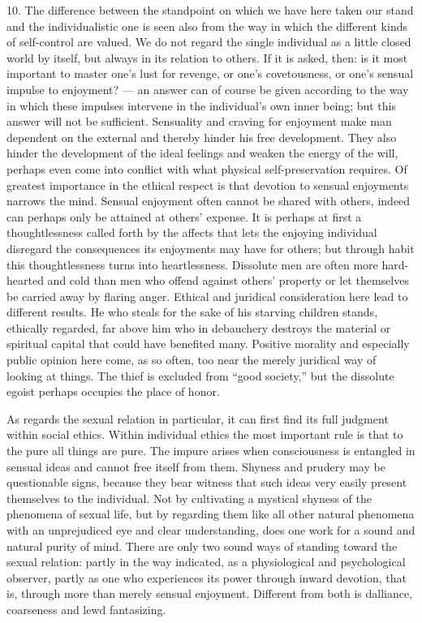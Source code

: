 \documentclass[12pt,a4paper,openany]{book}
\newcommand{\opage}[1]{\marginnote{\footnotesize\textit{[#1]}}}
\begin{document}
10. The difference between the standpoint on which we have here taken our stand and the individualistic one is seen
also from the way in which the different kinds of self-control are valued. We do not regard the single individual as
a little closed world by itself, but always in its relation to others. If it is asked, then: is it most important
to master one's lust for revenge, or one's covetousness, or one's sensual impulse to enjoyment? --- an answer can of
course be given according to the way in which these impulses intervene in the individual's own inner being; but this
answer will not be sufficient. Sensuality and craving for enjoyment make man dependent on the external and thereby
hinder his free development. They also hinder the development of the ideal feelings and weaken the energy of the
will, perhaps even come into conflict with what physical self-preservation requires. Of greatest importance in the
ethical respect is that devotion to sensual enjoyments narrows the mind. Sensual enjoyment often cannot be shared
with others, indeed can perhaps only be attained at others' expense. It is perhaps at first a thoughtlessness called
forth by the affects that lets the enjoying individual disregard the consequences its enjoyments may have for
others; but through habit this thoughtlessness turns into heartlessness. Dissolute men are often more hard-hearted
and cold than men who offend against others' property or let themselves be carried away by flaring anger. Ethical
and juridical consideration here lead to different results. He who steals for the sake of his starving children
stands, ethically regarded, far above him who in debauchery destroys the material or spiritual capital that could
have benefited many. Positive morality and especially public opinion here come, as so often, too near the merely
juridical way of looking at things. The thief is excluded from ``good society,'' but the dissolute egoist perhaps
occupies the place of honor.

As regards the sexual relation in particular, it can first
\opage{226}find its full judgment within social ethics. Within individual ethics the most important rule is that to the
pure all things are pure. The impure arises when consciousness is entangled in sensual ideas and cannot free itself
from them. Shyness and prudery may be questionable signs, because they bear witness that such ideas very easily
present themselves to the individual. Not by cultivating a mystical shyness of the phenomena of sexual life, but by
regarding them like all other natural phenomena with an unprejudiced eye and clear understanding, does one work for
a sound and natural purity of mind. There are only two sound ways of standing toward the sexual relation: partly in
the way indicated, as a physiological and psychological observer, partly as one who experiences its power through
inward devotion, that is, through more than merely sensual enjoyment. Different from both is dalliance, coarseness
and lewd fantasizing.
\end{document}
